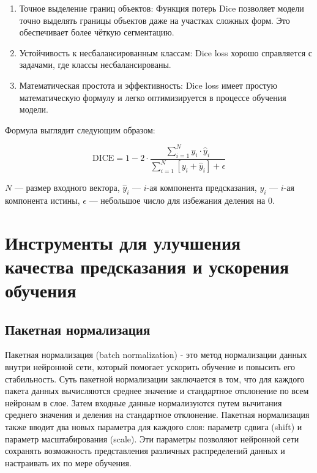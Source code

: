 \begin{enumerate}

	\item Точное выделение границ объектов: Функция потерь Dice позволяет
	модели точно выделять границы объектов даже на участках сложных форм. Это
	обеспечивает более чёткую сегментацию.

	\item Устойчивость к несбалансированным классам: Dice loss хорошо
	справляется с задачами, где классы несбалансированы.

	\item Математическая простота и эффективность: Dice loss имеет простую
	математическую формулу и легко оптимизируется в процессе обучения модели.

\end{enumerate}

Формула выглядит следующим образом:

\begin{equation}
	\text{DICE} = 1 - 2 \cdot \frac{\sum_{i=1}^{N} y_i \cdot \hat{y}_i}{\sum_{i=1}^{N} \left[y_i + \hat{y}_i \right] + \epsilon}
\end{equation}


\noindent $N$ --- размер входного вектора, $\hat{y}_i$ --- $i$-ая компонента
предсказания, $y_i$ --- $i$-ая компонента истины, $\epsilon$ --- небольшое
число для избежания деления на 0.

\section{Инструменты для улучшения качества предсказания и ускорения обучения}

\subsection{Пакетная нормализация}

Пакетная нормализация (batch normalization) - это метод нормализации данных
внутри нейронной сети, который помогает ускорить обучение и повысить его
стабильность. Суть пакетной нормализации заключается в том, что для каждого
пакета данных вычисляются среднее значение и стандартное отклонение по всем
нейронам в слое. Затем входные данные нормализуются путем вычитания среднего
значения и деления на стандартное отклонение. Пакетная нормализация также
вводит два новых параметра для каждого слоя: параметр сдвига (shift) и параметр
масштабирования (scale). Эти параметры позволяют нейронной сети сохранять
возможность представления различных распределений данных и настраивать их по
мере обучения.

